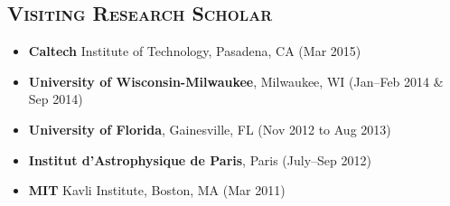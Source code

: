 \documentclass[10pt,a4paper]{moderncv}
\begin{document}
\subsection{\textsc{Visiting Research Scholar}}
\begin{itemize}
\item \textbf{Caltech} Institute of Technology, Pasadena, CA (Mar 2015) %
\item \textbf{University of Wisconsin-Milwaukee}, Milwaukee, WI (Jan--Feb 2014 \& Sep 2014) %
\item \textbf{University of Florida}, Gainesville, FL (Nov 2012 to Aug 2013) %
\item \textbf{Institut d'Astrophysique de Paris}, Paris (July--Sep 2012) %
\item \textbf{MIT} Kavli Institute, Boston, MA (Mar 2011)%
\end{itemize}
\end{document}
